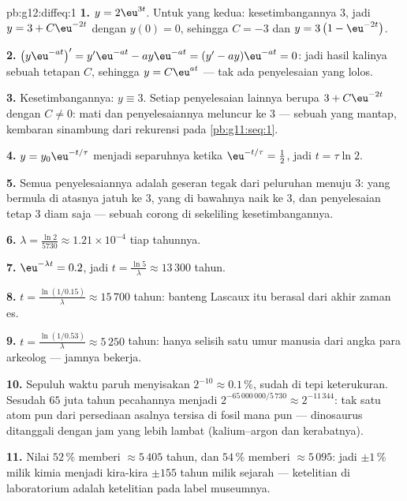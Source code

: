 \begin{solution}{pb:g12:diffeq:1}
\textbf{1.} $y = 2\eu^{3t}$. Untuk yang kedua: kesetimbangannya $3$,
jadi $y = 3 + C\eu^{-2t}$ dengan $y(0) = 0$, sehingga $C = -3$ dan
$y = 3\left(1 - \eu^{-2t}\right)$.

\textbf{2.} $\left(y\eu^{-at}\right)' = y'\eu^{-at} -
ay\eu^{-at} = (y' - ay)\eu^{-at} = 0$: jadi hasil kalinya sebuah
tetapan $C$, sehingga $y = C\eu^{at}$ --- tak ada penyelesaian yang lolos.

\textbf{3.} Kesetimbangannya: $y \equiv 3$. Setiap penyelesaian lainnya berupa
$3 + C\eu^{-2t}$ dengan $C \neq 0$:  mati dan
penyelesaiannya meluncur ke $3$ --- sebuah  yang mantap, kembaran
sinambung dari  rekurensi pada
\cref{pb:g11:seq:1}.

\textbf{4.} $y = y_0\eu^{-t/\tau}$ menjadi separuhnya ketika
$\eu^{-t/\tau} = \frac12$, jadi $t = \tau\ln 2$.

\textbf{5.} Semua penyelesaiannya adalah geseran tegak dari peluruhan
menuju $3$: yang bermula di atasnya jatuh ke $3$, yang di bawahnya
naik ke $3$, dan penyelesaian tetap $3$ diam saja --- sebuah
corong di sekeliling kesetimbangannya.

\textbf{6.} $\lambda = \frac{\ln 2}{5730} \approx 1.21 \times
10^{-4}$ tiap tahunnya.

\textbf{7.} $\eu^{-\lambda t} = 0.2$, jadi
$t = \frac{\ln 5}{\lambda} \approx 13\,300$ tahun.

\textbf{8.} $t = \frac{\ln(1/0.15)}{\lambda} \approx 15\,700$
tahun: banteng Lascaux itu berasal dari akhir zaman es.

\textbf{9.} $t = \frac{\ln(1/0.53)}{\lambda} \approx 5\,250$
tahun: hanya selisih satu umur manusia dari angka para arkeolog ---
jamnya bekerja.

\textbf{10.} Sepuluh waktu paruh menyisakan $2^{-10} \approx 0.1\,\%$,
sudah di tepi keterukuran. Sesudah $65$ juta tahun
pecahannya menjadi $2^{-65\,000\,000/5\,730} \approx 2^{-11\,344}$:
tak satu atom pun dari persediaan asalnya tersisa di fosil mana pun ---
dinosaurus ditanggali dengan jam yang lebih lambat (kalium--argon dan
kerabatnya).

\textbf{11.} Nilai $52\,\%$ memberi $\approx 5\,405$ tahun, dan
$54\,\%$ memberi $\approx 5\,095$: jadi $\pm 1\,\%$ milik kimia
menjadi kira-kira $\pm 155$ tahun milik sejarah --- ketelitian di
laboratorium adalah ketelitian pada label museumnya.


\end{solution}
